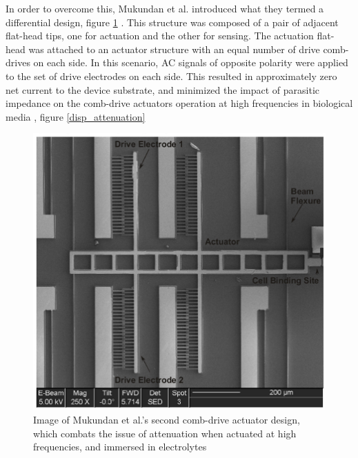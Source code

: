 In order to overcome this, Mukundan et al. introduced what they termed a differential design, figure \ref{vik_design_2} \cite{Mukundan2009}. This structure was composed of a pair of adjacent flat-head tips, one for actuation and the other for sensing. The actuation flat-head was attached to an actuator structure with an equal number of drive comb-drives on each side. In this scenario, AC signals of opposite polarity were applied to the set of drive electrodes on each side. This resulted in approximately zero net current to the device substrate, and minimized the impact of parasitic impedance on the comb-drive actuators operation at high frequencies in biological media \cite{Mukundan2009}, figure \ref{disp_attenuation} 

\begin{figure}[htpb]
    \includegraphics[width=\linewidth]{Chapter2/Figs/Raster/vikramDesgn2.png}
    \caption{Image of Mukundan et al.'s second comb-drive actuator design, which combats the issue of attenuation when actuated at high frequencies, and immersed in electrolytes} \label{vik_design_2}
\end{figure}

